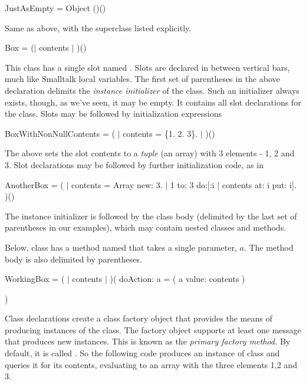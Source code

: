 \documentclass{article}
\begin{document}
\begin{newspeak}
\CLASS JustAsEmpty = Object ()()
\end{newspeak}

Same as above, with the superclass listed explicitly.

\begin{newspeak}
\CLASS Box = ($|$ contents $|$ )()
\end{newspeak}

This class has a single slot named . Slots are declared in between vertical bars, much like Smalltalk local variables. The first set of parentheses in the above declaration delimits the {\em instance initializer} of the class.  Such an initializer always exists, though, as we've seen, it may be empty. It contains all slot declarations for the class. Slots may be followed by initialization expressions

\begin{newspeak}
\CLASS BoxWithNonNullContents = ( $|$ contents =   \{1. 2. 3\}. $|$ )()
\end{newspeak}

The above sets the slot contents to a {\em tuple} (an array) with 3 elements - 1, 2 and 3.
Slot declarations may be followed by further initialization code, as in

\begin{newspeak}
\CLASS AnotherBox = ( 
  $|$  \PUBLIC contents =  Array new: 3. $|$ 
  1 to: 3 do:[:i $|$ contents at: i put: i].
  )()
\end{newspeak}

The instance initializer is followed by the class body (delimited by the last set of parentheses in our examples), which may contain nested classes and methods. 

Below, class  has a method named  that takes a single parameter, $a$. The method body is also delimited by parentheses.

\begin{newspeak}
\CLASS WorkingBox = ( 
  $|$ contents $|$ 
  )(
       \PUBLIC doAction: a = ( a value: contents )
 
  )
\end{newspeak}

Class declarations create a class factory object that provides the means of producing instances of the class. The factory object supports at least one message that produces new instances. This is known as the {\em primary factory method.} By default, it is called . So the following code produces an instance of class  and queries it for its contents, evaluating to an array with the three elements 1,2 and 3.
\end{document}
